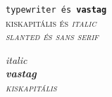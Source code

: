 \documentclass{article}
\begin{document}
\noindent
\texttt{typewriter és \textbf{vastag}}\\
\scshape{kiskapitális és \textit{italic}}\\
\slshape{slanted és \textsf{sans serif}}\par


\noindent
\emph{\textit{italic}}\\
\emph{\textbf{vastag}}\\
\emph{\textsc{kiskapitális}}\par
\end{document}
